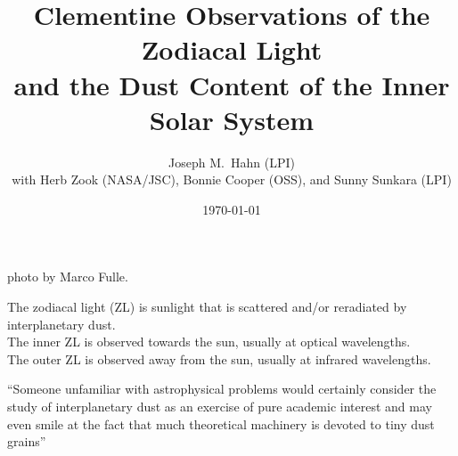 \documentclass[20pt,35mmSlide,landscape]{foils}
\title{\vspace*{-5ex}Clementine Observations of the Zodiacal
Light\\
and the Dust Content of the Inner Solar System\vspace*{1.5ex}}
\author{Joseph M.\ Hahn (LPI)\vspace*{4ex}\\
with Herb Zook (NASA/JSC), Bonnie Cooper (OSS),
and Sunny Sunkara (LPI)\vspace*{3ex}}
\date{\today}
\begin{document}
\maketitle

\pagecolor{light-yellow}

\begin{figure}
\vspace*{-0.75in}\centerline{}
\end{figure}

\pagecolor{light-yellow}

\parbox{10in}{
\parbox{5in}{
\begin{figure}[t]
\vspace*{-6ex}
\end{figure}
{\hspace{10ex}\footnotesize photo by Marco Fulle.}
}
\parbox[c]{4.5in}{

\vspace*{-4ex}The zodiacal light (ZL) is sunlight that is
scattered and/or reradiated by interplanetary dust.\\

The inner ZL is observed towards the sun,
usually at optical wavelengths.\\

The outer ZL is observed away from the sun,
usually at infrared wavelengths.
}
}

\pagecolor{light-yellow}

\begin{center}
\end{center}

``Someone unfamiliar with astrophysical problems would certainly
consider the study of interplanetary dust as an exercise of pure
academic interest and may even smile at the fact that much
theoretical machinery is devoted to tiny dust grains''
\end{document}
